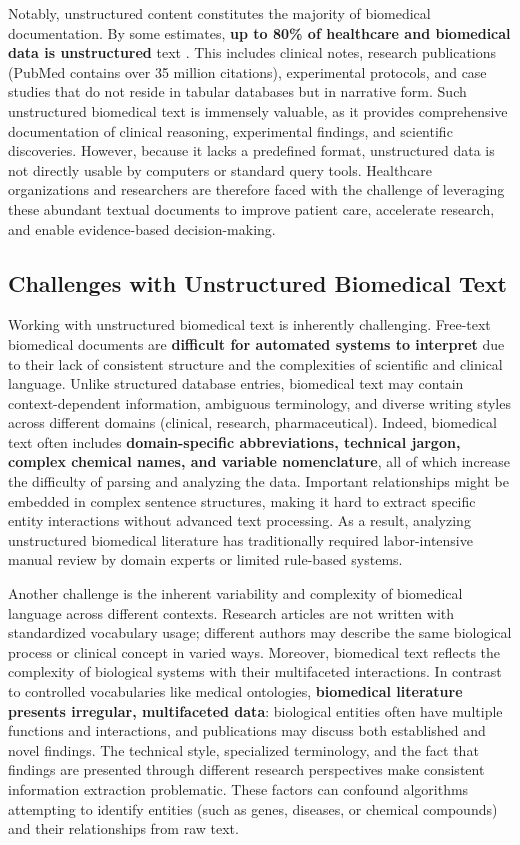 Notably, unstructured content constitutes the majority of biomedical documentation. By some estimates, \textbf{up to 80\% of healthcare and biomedical data is unstructured} text \parencite{Kong2019}. This includes clinical notes, research publications (PubMed contains over 35 million citations), experimental protocols, and case studies that do not reside in tabular databases but in narrative form. Such unstructured biomedical text is immensely valuable, as it provides comprehensive documentation of clinical reasoning, experimental findings, and scientific discoveries. However, because it lacks a predefined format, unstructured data is not directly usable by computers or standard query tools. Healthcare organizations and researchers are therefore faced with the challenge of leveraging these abundant textual documents to improve patient care, accelerate research, and enable evidence-based decision-making.

\subsection{Challenges with Unstructured Biomedical Text}

Working with unstructured biomedical text is inherently challenging. Free-text biomedical documents are \textbf{difficult for automated systems to interpret} due to their lack of consistent structure and the complexities of scientific and clinical language. Unlike structured database entries, biomedical text may contain context-dependent information, ambiguous terminology, and diverse writing styles across different domains (clinical, research, pharmaceutical). Indeed, biomedical text often includes \textbf{domain-specific abbreviations, technical jargon, complex chemical names, and variable nomenclature}, all of which increase the difficulty of parsing and analyzing the data. Important relationships might be embedded in complex sentence structures, making it hard to extract specific entity interactions without advanced text processing. As a result, analyzing unstructured biomedical literature has traditionally required labor-intensive manual review by domain experts or limited rule-based systems.

Another challenge is the inherent variability and complexity of biomedical language across different contexts. Research articles are not written with standardized vocabulary usage; different authors may describe the same biological process or clinical concept in varied ways. Moreover, biomedical text reflects the complexity of biological systems with their multifaceted interactions. In contrast to controlled vocabularies like medical ontologies, \textbf{biomedical literature presents irregular, multifaceted data}: biological entities often have multiple functions and interactions, and publications may discuss both established and novel findings. The technical style, specialized terminology, and the fact that findings are presented through different research perspectives make consistent information extraction problematic. These factors can confound algorithms attempting to identify entities (such as genes, diseases, or chemical compounds) and their relationships from raw text.

